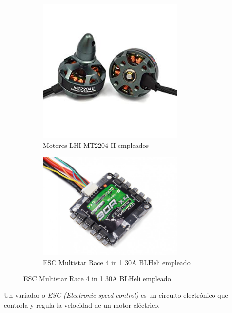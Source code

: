 \newpage
\begin{figure}[htb!]
	\centering
	\begin{subfigure}{0.4\textwidth}
		\centering
		\includegraphics[width=0.8\textwidth,height=0.2\textheight]{hardware/motores.jpg}
		\caption{Motores LHI MT2204 II empleados}
		\label{hardware:motores}
	\end{subfigure}
	\begin{subfigure}{0.4\textwidth}
		\centering
		\includegraphics[width=0.8\textwidth,height=0.2\textheight]{hardware/esc.jpg}
		\caption{ESC Multistar Race 4 in 1 30A BLHeli empleado}
		\label{hardware:esc}
	\end{subfigure}
\end{figure}


Un variador o \textit{ESC (Electronic speed control)} es un circuito electrónico que controla y regula la velocidad de un motor eléctrico. \\

